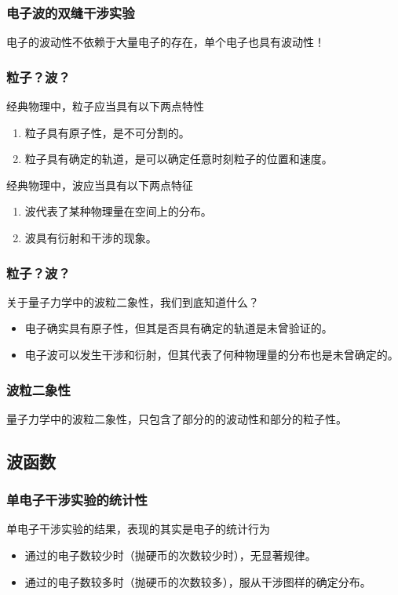 \begin{frame}
    \frametitle{电子波的双缝干涉实验}
    \begin{center}
        电子的波动性不依赖于大量电子的存在，单个电子也具有波动性！
    \end{center}
\end{frame}

\begin{frame}
    \frametitle{粒子？波？}
    经典物理中，粒子应当具有以下两点特性
    \begin{enumerate}
        \item 粒子具有原子性，是不可分割的。
        \item 粒子具有确定的轨道，是可以确定任意时刻粒子的位置和速度。
    \end{enumerate}
    经典物理中，波应当具有以下两点特征
    \begin{enumerate}
        \item 波代表了某种物理量在空间上的分布。
        \item 波具有衍射和干涉的现象。
    \end{enumerate}
\end{frame}

\begin{frame}
    \frametitle{粒子？波？}
    关于量子力学中的波粒二象性，我们到底知道什么？
    \begin{itemize}
        \item 电子确实具有原子性，但其是否具有确定的轨道是未曾验证的。
        \item 电子波可以发生干涉和衍射，但其代表了何种物理量的分布也是未曾确定的。
    \end{itemize}
\end{frame}

\begin{frame}
    \frametitle{波粒二象性}
    \begin{center}
        量子力学中的波粒二象性，只包含了部分的的波动性和部分的粒子性。
    \end{center}
\end{frame}

\subsection{波函数}

\begin{frame}
    \frametitle{单电子干涉实验的统计性}
    单电子干涉实验的结果，表现的其实是电子的统计行为
    \begin{itemize}
        \item 通过的电子数较少时（抛硬币的次数较少时），无显著规律。
        \item 通过的电子数较多时（抛硬币的次数较多），服从干涉图样的确定分布。
    \end{itemize}
\end{frame}

